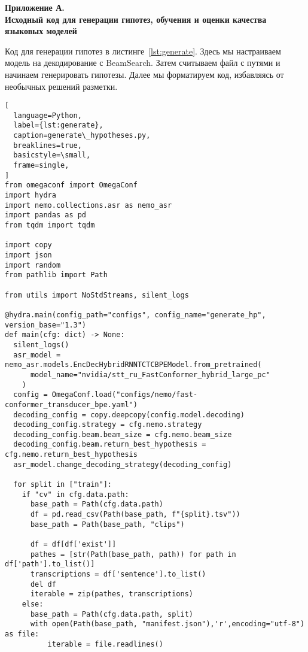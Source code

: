 \newpage
\begin{center}
  \textbf{\large Приложение А.\\Исходный код для генерации гипотез, обучения и оценки качества языковых моделей}
\end{center}

Код для генерации гипотез в листинге~\ref{lst:generate}.
Здесь мы настраиваем модель на декодирование с BeamSearch.
Затем считываем файл с путями и начинаем генерировать гипотезы.
Далее мы форматируем код, избавляясь от необычных решений разметки.

\begin{lstlisting}[
  language=Python,
  label={lst:generate},
  caption=generate\_hypotheses.py,
  breaklines=true,
  basicstyle=\small,
  frame=single,
]
from omegaconf import OmegaConf
import hydra
import nemo.collections.asr as nemo_asr
import pandas as pd
from tqdm import tqdm

import copy
import json
import random
from pathlib import Path

from utils import NoStdStreams, silent_logs

@hydra.main(config_path="configs", config_name="generate_hp", version_base="1.3")
def main(cfg: dict) -> None:
  silent_logs()
  asr_model = nemo_asr.models.EncDecHybridRNNTCTCBPEModel.from_pretrained(
      model_name="nvidia/stt_ru_FastConformer_hybrid_large_pc"
    )
  config = OmegaConf.load("configs/nemo/fast-conformer_transducer_bpe.yaml")
  decoding_config = copy.deepcopy(config.model.decoding)
  decoding_config.strategy = cfg.nemo.strategy
  decoding_config.beam.beam_size = cfg.nemo.beam_size
  decoding_config.beam.return_best_hypothesis = cfg.nemo.return_best_hypothesis
  asr_model.change_decoding_strategy(decoding_config)

  for split in ["train"]:
    if "cv" in cfg.data.path:
      base_path = Path(cfg.data.path)
      df = pd.read_csv(Path(base_path, f"{split}.tsv"))
      base_path = Path(base_path, "clips")

      df = df[df['exist']]
      pathes = [str(Path(base_path, path)) for path in df['path'].to_list()]
      transcriptions = df['sentence'].to_list()
      del df
      iterable = zip(pathes, transcriptions)
    else:
      base_path = Path(cfg.data.path, split)
      with open(Path(base_path, "manifest.json"),'r',encoding="utf-8") as file:
          iterable = file.readlines()


\end{lstlisting}
